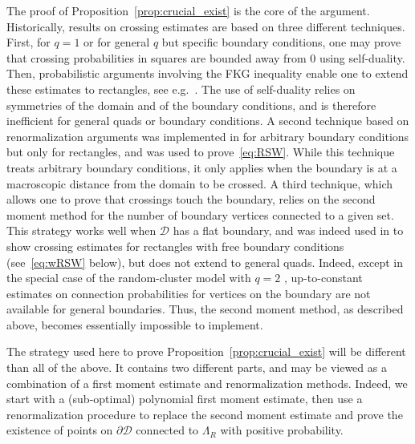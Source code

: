 \documentclass[a4paper,oneside,11pt]{article}
\numberwithin{equation}{section}
\numberwithin{equation}{section}
\numberwithin{equation}{section}
\newcommand{\calD}{\mathcal{D}}
\newcommand{\La}{\Lambda}
\begin{document}
The proof of Proposition~\ref{prop:crucial_exist} is the core of the argument. Historically, results on crossing estimates are based on three different techniques. 
First, for $q=1$ or for general $q$ but specific boundary conditions, one may prove that crossing probabilities in squares are bounded away from $0$ using self-duality. Then, probabilistic arguments involving the FKG inequality enable one to extend these estimates to rectangles, see e.g.~\cite{Rus78,SeyWel78,BefDum12}. The use of self-duality relies on symmetries of the domain and of the boundary conditions, and is therefore inefficient for general quads or boundary conditions. 
A second technique based on renormalization arguments was implemented in \cite{DumSidTas16,DumTas18} for arbitrary boundary conditions but only for rectangles, and was used to prove~\eqref{eq:RSW}. While this technique treats arbitrary boundary conditions, it only applies when the boundary is at a macroscopic distance from the domain to be crossed.  
A third technique, which allows one  to prove that crossings touch the boundary, relies on the second moment method for the number of boundary vertices connected to a given set. This strategy works well when $\calD$ has a flat boundary, and was indeed used in \cite{DumSidTas16} to show crossing estimates for rectangles with free boundary conditions (see~\eqref{eq:wRSW} below), but does not extend to general quads. 
Indeed, except in the special case of the random-cluster model with $q=2$ \cite{DumHonNol11,CheDumHon13}, up-to-constant estimates on connection probabilities for vertices on the boundary are not available for general boundaries. Thus, the second moment method, as described above, becomes essentially impossible to implement.
 
The strategy used here to prove Proposition~\ref{prop:crucial_exist} will be  different than all of the above. 
It contains two different parts, and may be viewed as a combination of a first moment estimate and renormalization methods. Indeed, we start with a (sub-optimal) polynomial first moment estimate, then use a renormalization procedure to replace the second moment estimate and prove the existence of points on $\partial \calD$ connected to $\La_R$ with positive probability. 
 
\end{document}
